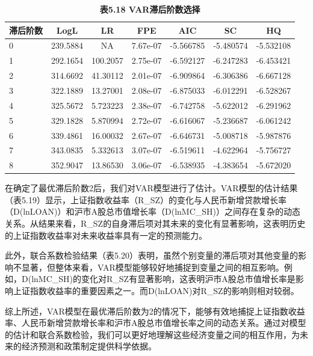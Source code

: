 \documentclass[12pt, a4paper]{article}
\numberwithin{equation}{section}
\begin{document}
\begin{table}[h!]
    \centering
    \captionsetup{labelformat=empty}
    \caption{\textbf{\fontsize{9pt}{11pt}\selectfont 表5.18 VAR滞后阶数选择}}
    \begin{tabular}{lcccccc}
        \toprule
        滞后阶数 & LogL     & LR       & FPE      & AIC       & SC        & HQ        \\
        \midrule
        0    & 239.5884 & NA       & 7.67e-07 & -5.566785 & -5.480574 & -5.532108 \\
        1    & 292.1654 & 100.2057 & 2.75e-07 & -6.592127 & -6.247283 & -6.453421 \\
        2    & 314.6692 & 41.30112 & 2.01e-07 & -6.909864 & -6.306386 & -6.667128 \\
        3    & 322.1889 & 13.27001 & 2.08e-07 & -6.875033 & -6.012291 & -6.528267 \\
        4    & 325.5672 & 5.723223 & 2.38e-07 & -6.742758 & -5.622012 & -6.291962 \\
        5    & 329.1828 & 5.870994 & 2.72e-07 & -6.616067 & -5.236687 & -6.061242 \\
        6    & 339.4861 & 16.00032 & 2.67e-07 & -6.646731 & -5.008718 & -5.987876 \\
        7    & 343.0835 & 5.332613 & 3.07e-07 & -6.519611 & -4.622964 & -5.756727 \\
        8    & 352.9047 & 13.86530 & 3.06e-07 & -6.538935 & -4.383654 & -5.672020 \\
        \bottomrule
    \end{tabular}
\end{table}

在确定了最优滞后阶数2后，我们对VAR模型进行了估计。VAR模型的估计结果（表5.19）显示，上证指数收益率（R\_SZ）的变化与人民币新增贷款增长率（D(lnLOAN)）和沪市A股总市值增长率（D(lnMC\_SH)）之间存在复杂的动态关系。从结果来看，R\_SZ的自身滞后项对其未来的变化有显著影响，这表明历史的上证指数收益率对未来收益率具有一定的预测能力。

此外，联合系数检验结果（表5.20）表明，虽然个别变量的滞后项对其他变量的影响不显著，但整体来看，VAR模型能够较好地捕捉到变量之间的相互影响。例如，D(lnMC\_SH)的变化对R\_SZ有显著影响，这表明沪市A股总市值增长率是影响上证指数收益率的重要因素之一。而D(lnLOAN)对R\_SZ的影响则相对较弱。

综上所述，VAR模型在最优滞后阶数为2的情况下，能够有效地捕捉上证指数收益率、人民币新增贷款增长率和沪市A股总市值增长率之间的动态关系。通过对模型的估计和联合系数检验，我们可以更好地理解这些经济变量之间的相互作用，为未来的经济预测和政策制定提供科学依据。
\end{document}
